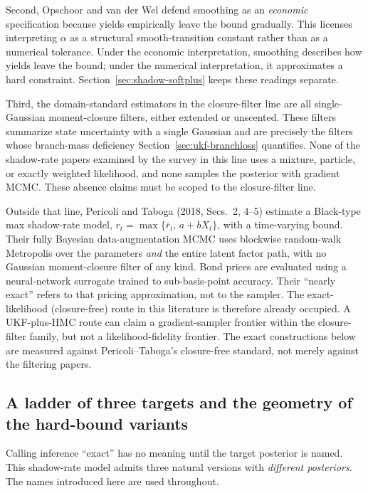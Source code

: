 \documentclass[11pt]{article}
\begin{document}
Second, Opschoor and van der Wel defend smoothing as an \emph{economic} specification because yields empirically leave the bound gradually. This licenses interpreting \(\alpha\) as a structural smooth-transition constant rather than as a numerical tolerance. Under the economic interpretation, smoothing describes how yields leave the bound; under the numerical interpretation, it approximates a hard constraint. Section~\ref{sec:shadow-softplus} keeps these readings separate.

Third, the domain-standard estimators in the closure-filter line are all single-Gaussian moment-closure filters, either extended or unscented. These filters summarize state uncertainty with a single Gaussian and are precisely the filters whose branch-mass deficiency Section~\ref{sec:ukf-branchloss} quantifies. None of the shadow-rate papers examined by the survey in this line uses a mixture, particle, or exactly weighted likelihood, and none samples the posterior with gradient MCMC. These absence claims must be scoped to the closure-filter line.

Outside that line, Pericoli and Taboga (2018, Secs.~2, 4--5) estimate a Black-type max shadow-rate model,
\(r_t=\max\{\bar r_t,\,a+bX_t\}\), with a time-varying bound. Their fully Bayesian data-augmentation MCMC uses blockwise random-walk Metropolis over the parameters \emph{and} the entire latent factor path, with no Gaussian moment-closure filter of any kind. Bond prices are evaluated using a neural-network surrogate trained to sub-basis-point accuracy. Their ``nearly exact'' refers to that pricing approximation, not to the sampler. The exact-likelihood (closure-free) route in this literature is therefore already occupied. A UKF-plus-HMC route can claim a gradient-sampler frontier within the closure-filter family, but not a likelihood-fidelity frontier. The exact constructions below are measured against Pericoli--Taboga's closure-free standard, not merely against the filtering papers.

\subsection{A ladder of three targets and the geometry of the
hard-bound variants}
\label{sec:shadow-ladder}

Calling inference ``exact'' has no meaning until the target posterior is named. This shadow-rate model admits three natural versions with \emph{different posteriors}. The names introduced here are used throughout.
\end{document}
